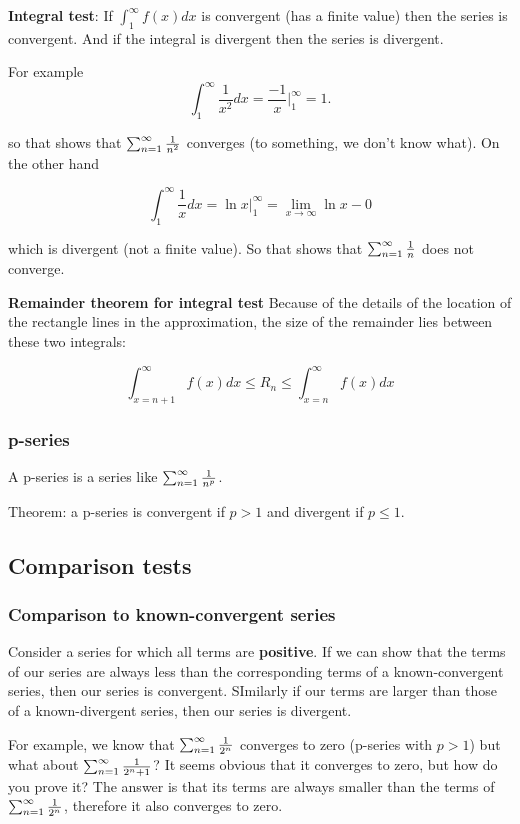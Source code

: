 \textbf{Integral test}: If $\int_1^\infty f(x) dx$ is convergent (has a finite value) then the series is convergent. And if the integral is divergent then the series is divergent.

For example
$$
\int_1^\infty \frac{1}{x^2} dx = \frac{-1}{x} \Big|_1^\infty = 1.
$$

so that shows that $\sum_{n=1}^{\infty} \frac{1}{n^2}$ converges (to something, we don't know what). On the other hand

$$
\int_1^\infty \frac{1}{x} dx = \ln x \Big|_1^\infty = \lim_{x \to \infty} \ln x - 0
$$

which is divergent (not a finite value). So that shows that $\sum_{n=1}^{\infty} \frac{1}{n}$ does not converge.

\textbf{Remainder theorem for integral test}
Because of the details of the location of the rectangle lines in the approximation, the size of the remainder lies between these two integrals:

$$
\int_{x=n+1}^\infty f(x) dx \leq R_n \leq \int_{x=n}^\infty f(x) dx
$$


\subsubsection{p-series}

A p-series is a series like $\sum_{n=1}^{\infty} \frac{1}{n^p}$.

Theorem: a p-series is convergent if $p>1$ and divergent if $p \leq 1$.

\subsection{Comparison tests}

\subsubsection{Comparison to known-convergent series}
Consider a series for which all terms are \textbf{positive}. If we can show that the terms of our series are always less than the corresponding terms of a known-convergent series, then our series is convergent. SImilarly if our terms are larger than those of a known-divergent series, then our series is divergent.

For example, we know that $\sum_{n=1}^{\infty}\frac{1}{2^n}$ converges to zero (p-series with $p > 1$) but what about $\sum_{n=1}^{\infty}\frac{1}{2^n + 1}$? It seems obvious that it converges to zero, but how do you prove it? The answer is that its terms are always smaller than the terms of $\sum_{n=1}^{\infty}\frac{1}{2^n}$, therefore it also converges to zero.


